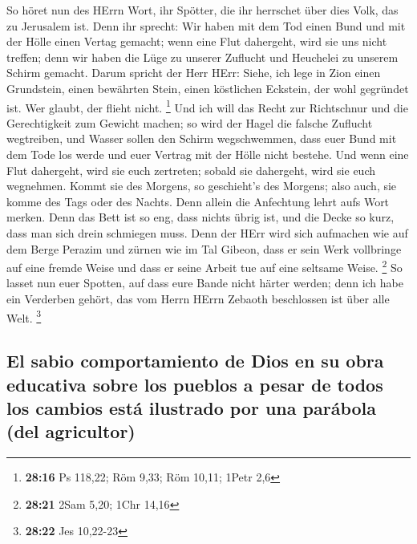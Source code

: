  So höret nun des HErrn Wort, ihr Spötter, die ihr
herrschet über dies Volk, das zu Jerusalem ist.  Denn ihr
sprecht: Wir haben mit dem Tod einen Bund und mit der Hölle einen Vertag
gemacht; wenn eine Flut dahergeht, wird sie uns nicht treffen; denn wir
haben die Lüge zu unserer Zuflucht und Heuchelei zu unserem Schirm
gemacht.  Darum spricht der Herr HErr: Siehe, ich lege in
Zion einen Grundstein, einen bewährten Stein, einen köstlichen Eckstein,
der wohl gegründet ist. Wer glaubt, der flieht nicht. \footnote{\textbf{28:16}
  Ps 118,22; Röm 9,33; Röm 10,11; 1Petr 2,6}  Und ich
will das Recht zur Richtschnur und die Gerechtigkeit zum Gewicht machen;
so wird der Hagel die falsche Zuflucht wegtreiben, und Wasser sollen den
Schirm wegschwemmen,  dass euer Bund mit dem Tode los
werde und euer Vertrag mit der Hölle nicht bestehe. Und wenn eine Flut
dahergeht, wird sie euch zertreten; sobald sie dahergeht, wird sie euch
wegnehmen.  Kommt sie des Morgens, so geschieht's des
Morgens; also auch, sie komme des Tags oder des Nachts. Denn allein die
Anfechtung lehrt aufs Wort merken.  Denn das Bett ist so
eng, dass nichts übrig ist, und die Decke so kurz, dass man sich drein
schmiegen muss.  Denn der HErr wird sich aufmachen wie
auf dem Berge Perazim und zürnen wie im Tal Gibeon, dass er sein Werk
vollbringe auf eine fremde Weise und dass er seine Arbeit tue auf eine
seltsame Weise. \footnote{\textbf{28:21} 2Sam 5,20; 1Chr 14,16}
 So lasset nun euer Spotten, auf dass eure Bande nicht
härter werden; denn ich habe ein Verderben gehört, das vom Herrn HErrn
Zebaoth beschlossen ist über alle Welt. \footnote{\textbf{28:22} Jes
  10,22-23}

\hypertarget{el-sabio-comportamiento-de-dios-en-su-obra-educativa-sobre-los-pueblos-a-pesar-de-todos-los-cambios-estuxe1-ilustrado-por-una-paruxe1bola-del-agricultor}{%
\subsection{El sabio comportamiento de Dios en su obra educativa sobre
los pueblos a pesar de todos los cambios está ilustrado por una parábola
(del
agricultor)}\label{el-sabio-comportamiento-de-dios-en-su-obra-educativa-sobre-los-pueblos-a-pesar-de-todos-los-cambios-estuxe1-ilustrado-por-una-paruxe1bola-del-agricultor}}

